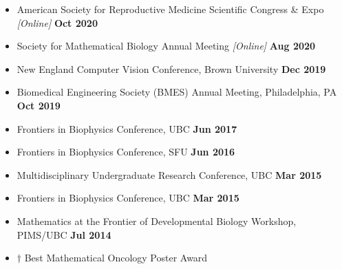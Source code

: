 \documentclass[margin,line]{res}
\begin{document}
\begin{resume}
{\begin{itemize}
\item[] American Society for Reproductive Medicine Scientific Congress \& Expo \textit{[Online]} \hfill {\bf \small  Oct 2020}
\item[] Society for Mathematical Biology Annual Meeting\textsuperscript{\textdagger} \textit{[Online]} \hfill {\bf \small  Aug 2020}
\item[] New England Computer Vision Conference, Brown University \hfill {\bf \small  Dec 2019}
\item[] Biomedical Engineering Society (BMES) Annual Meeting, Philadelphia, PA \hfill {\bf \small  Oct 2019}
\item[] Frontiers in Biophysics Conference, UBC \hfill {\bf \small  Jun 2017}
\item[] Frontiers in Biophysics Conference, SFU \hfill {\bf \small Jun 2016}
\item[] Multidisciplinary Undergraduate Research Conference, UBC \hfill {\bf \small Mar 2015}
\item[] Frontiers in Biophysics Conference, UBC \hfill {\bf \small Mar 2015}
\item[] Mathematics at the Frontier of Developmental Biology Workshop, PIMS/UBC \hfill {\bf \small Jul 2014}
\item[] $\dagger$ Best Mathematical Oncology Poster Award

\end{itemize}}
\end{resume}
\end{document}
